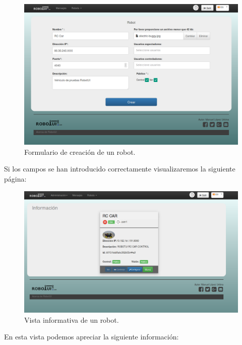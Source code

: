\begin{figure}[H]
  \begin{center}
    \includegraphics[scale=0.3]{imagenes/manual-usuario/pagina-crear-robot.png}
  \end{center}
  \caption{Formulario de creación de un robot.}
  \label{website:creacion-robot}
\end{figure}


Si los campos se han introducido correctamente visualizaremos la siguiente página:

\begin{figure}[H]
  \begin{center}
    \includegraphics[scale=0.3]{imagenes/manual-usuario/show-robot.png}
  \end{center}
  \caption{Vista informativa de un robot.}
  \label{website:creacion-robot}
\end{figure}

En esta vista podemos apreciar la siguiente información:


